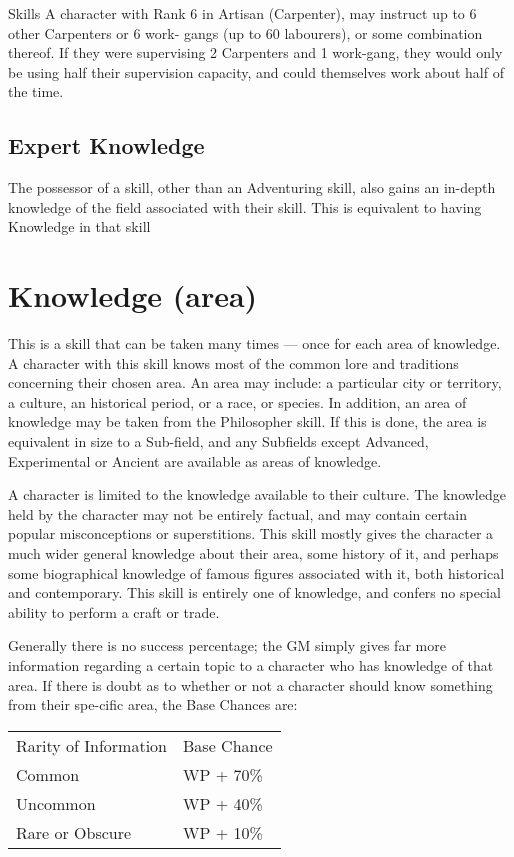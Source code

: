 \begin{Chapter}{Skills}
A character with Rank 6 in Artisan (Carpenter), may instruct up to 6
other Carpenters or 6 work- gangs (up to 60 labourers), or some
combination thereof.  If they were supervising 2 Carpenters and 1
work-gang, they would only be using half their supervision capacity,
and could themselves work about half of the time.

\subsection{Expert Knowledge}

The possessor of a skill, other than an Adventuring skill, also gains
an in-depth knowledge of the field associated with their skill.  This
is equivalent to having Knowledge in that skill

\section{Knowledge (area)}

This is a skill that can be taken many times — once for each area of
knowledge.  A character with this skill knows most of the common lore
and traditions concerning their chosen area. An area may include: a
particular city or territory, a culture, an historical period, or a
race, or species. In addition, an area of knowledge may be taken from
the Philosopher skill. If this is done, the area is equivalent in size
to a Sub-field, and any Subfields except Advanced, Experimental or
Ancient are available as areas of knowledge.

A character is limited to the knowledge available to their
culture. The knowledge held by the character may not be entirely
factual, and may contain certain popular misconceptions or
superstitions.  This skill mostly gives the character a much wider
general knowledge about their area, some history of it, and perhaps
some biographical knowledge of famous figures associated with it, both
historical and contemporary.  This skill is entirely one of knowledge,
and confers no special ability to perform a craft or trade.

Generally there is no success percentage; the GM simply gives far more
information regarding a certain topic to a character who has knowledge
of that area.  If there is doubt as to whether or not a character
should know something from their spe-cific area, the Base Chances are:

\begin{tabularx}{\columnwidth}{XX} \\
Rarity of Information	& Base Chance  \\
Common 			& WP + 70\%  \\
Uncommon 		& WP + 40\%  \\
Rare or Obscure		&WP + 10\% \\
\end{tabularx}


\end{Chapter}
